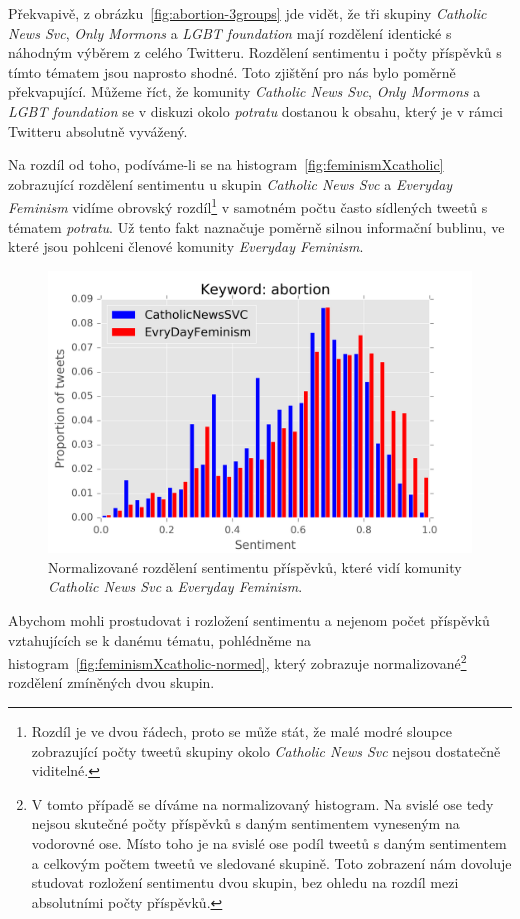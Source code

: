 \documentclass[12pt, a4paper]{article}
\numberwithin{equation}{section} 	%
\begin{document}
Překvapivě, z obrázku~\autoref{fig:abortion-3groups} jde vidět, že tři skupiny \textit{Catholic News Svc}, \textit{Only Mormons} a \textit{LGBT foundation} mají rozdělení identické s náhodným výběrem z celého Twitteru. Rozdělení sentimentu i počty příspěvků s tímto tématem jsou naprosto shodné. Toto zjištění pro nás bylo poměrně překvapující. Můžeme říct, že komunity \textit{Catholic News Svc}, \textit{Only Mormons} a \textit{LGBT foundation} se v diskuzi okolo \textit{potratu} dostanou k obsahu, který je v rámci Twitteru absolutně vyvážený.

Na rozdíl od toho, podíváme-li se na histogram~\autoref{fig:feminismXcatholic} zobrazující rozdělení sentimentu u skupin \textit{Catholic News Svc} a \textit{Everyday Feminism} vidíme obrovský rozdíl\footnote{Rozdíl je ve dvou řádech, proto se může stát, že malé modré sloupce zobrazující počty tweetů skupiny okolo \textit{Catholic News Svc} nejsou dostatečně viditelné.} v samotném počtu často sídlených tweetů s tématem \textit{potratu}. Už tento fakt naznačuje poměrně silnou informační bublinu, ve které jsou pohlceni členové komunity \textit{Everyday Feminism}.
\begin{figure}[h]
\centering
\includegraphics[scale=0.5]{./Pics/feminismXcatholic-normed.png}
\caption{Normalizované rozdělení sentimentu příspěvků, které vidí komunity \textit{Catholic News Svc} a \textit{Everyday Feminism}.}
\label{fig:feminismXcatholic-normed}
\end{figure}
Abychom mohli prostudovat i rozložení sentimentu a nejenom počet příspěvků vztahujících se k danému tématu, pohlédněme na histogram~\autoref{fig:feminismXcatholic-normed}, který zobrazuje normalizované\footnote{V tomto případě se díváme na normalizovaný histogram. Na svislé ose tedy nejsou skutečné počty příspěvků s daným sentimentem vyneseným na vodorovné ose. Místo toho je na svislé ose podíl tweetů s daným sentimentem a celkovým počtem tweetů ve sledované skupině. Toto zobrazení nám dovoluje studovat rozložení sentimentu dvou skupin, bez ohledu na rozdíl mezi absolutními počty příspěvků.} rozdělení zmíněných dvou skupin.
\end{document}
